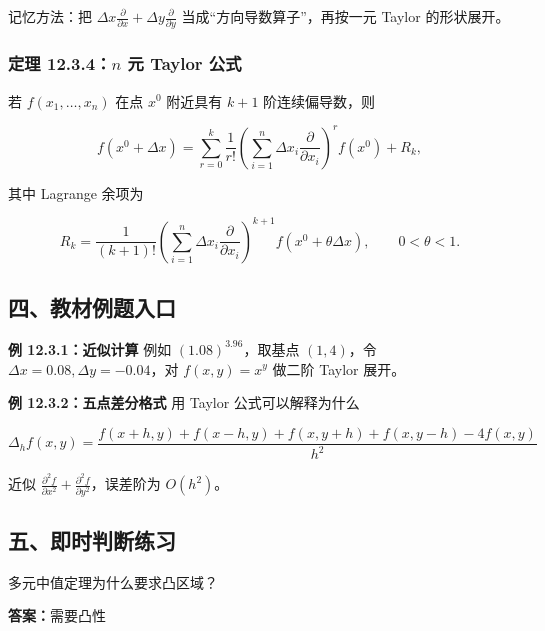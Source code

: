 \begin{notebox}
记忆方法：把 \(\Delta x\frac{\partial}{\partial x}+\Delta y\frac{\partial}{\partial y}\) 当成“方向导数算子”，再按一元 Taylor 的形状展开。
\end{notebox}

\subsubsection*{定理 12.3.4：\(n\) 元 Taylor 公式}

若 \(f(x_1,\ldots,x_n)\) 在点 \(x^0\) 附近具有 \(k+1\) 阶连续偏导数，则

\[
      f(x^0+\Delta x)
      =
      \sum_{r=0}^{k}
      \frac1{r!}
      \left(\sum_{i=1}^{n}\Delta x_i\frac{\partial}{\partial x_i}\right)^r
      f(x^0)
      +R_k,
    \]

其中 Lagrange 余项为

\[
      R_k=
      \frac1{(k+1)!}
      \left(\sum_{i=1}^{n}\Delta x_i\frac{\partial}{\partial x_i}\right)^{k+1}
      f(x^0+\theta\Delta x),
      \qquad 0<\theta<1.
    \]

\subsection*{四、教材例题入口}

\begin{conceptbox}
\textbf{例 12.3.1：近似计算}
例如 \((1.08)^{3.96}\)，取基点 \((1,4)\)，令 \(\Delta x=0.08,\Delta y=-0.04\)，对 \(f(x,y)=x^y\) 做二阶 Taylor 展开。
\end{conceptbox}

\begin{conceptbox}
\textbf{例 12.3.2：五点差分格式}
用 Taylor 公式可以解释为什么

\[
          \Delta_h f(x,y)=
          \frac{f(x+h,y)+f(x-h,y)+f(x,y+h)+f(x,y-h)-4f(x,y)}{h^2}
        \]

近似 \(\frac{\partial^2f}{\partial x^2}+\frac{\partial^2f}{\partial y^2}\)，误差阶为 \(O(h^2)\)。
\end{conceptbox}

\subsection*{五、即时判断练习}

\begin{quickcheck}
多元中值定理为什么要求凸区域？

\tcblower
\textbf{答案：}需要凸性
\end{quickcheck}

